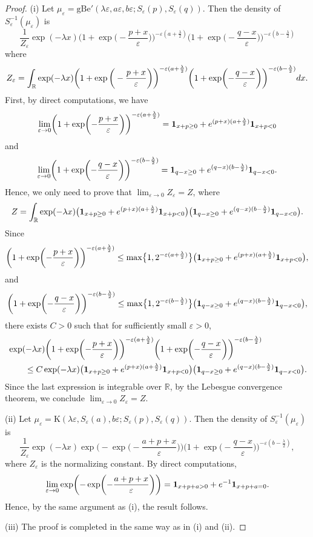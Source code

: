 \documentclass[10pt,a4paper]{amsart}
\def\R{\mathbb{R}}
\def\e{\varepsilon}
\newcommand{\la}{\lambda}
\begin{document}
\begin{proof}
(i) Let $\mu_{\e}=\mathrm{gBe}'(\la \e, a\e ,b \e; S_{\e}(p), S_{\e}(q))$. Then the density of $S_{\e}^{-1}(\mu_{\e})$ is
\[
\frac{1}{Z_{\e}}\exp(-\la x) \biggl(1 +\exp\biggl(-\frac{p+x}{\e}\biggr)\biggr)^{-\e(a+\frac{\la}{2})}\biggl(1 +\exp\biggl(-\frac{q-x}{\e}\biggr)\biggr)^{-\e(b-\frac{\la}{2})}
 \]
 where
 \[
 Z_{\e}=\int_{\R}\exp(-\la x) \biggl(1 +\exp\bigg(-\frac{p+x}{\e}\biggr)\biggr)^{-\e(a+\frac{\la}{2})}\biggl(1 +\exp\biggl(-\frac{q-x}{\e}\biggr)\biggr)^{-\e(b-\frac{\la}{2})} {\rm d}x.
 \]
 First, by direct computations, we have
 \[
 \lim_{\e \to 0}\biggl(1 +\exp\biggl(-\frac{p+x}{\e}\biggr)\biggr)^{-\e(a+\frac{\la}{2})}= \mathbf{1}_{x+p \ge 0} + {\rm e}^{ (p+x)(a+\frac{\la}{2})}\mathbf{1}_{x+p < 0}
 \]
 and
 \[
 \lim_{\e \to 0}\biggl(1 +\exp\biggl(-\frac{q-x}{\e}\biggr)\biggr)^{-\e(b-\frac{\la}{2})}= \mathbf{1}_{q-x \ge 0} + {\rm e}^{ (q-x)(b-\frac{\la}{2})}\mathbf{1}_{q-x < 0}.
 \]
 Hence, we only need to prove that $ \lim_{\e \to 0}Z_{\e}=Z$, where
 \[
 Z=\int_{\R} \exp(-\la x)\bigl( \mathbf{1}_{x+p \ge 0} + {\rm e}^{ (p+x)(a+\frac{\la}{2})}\mathbf{1}_{x+p < 0}
 \bigr)\bigl( \mathbf{1}_{q-x \ge 0} + {\rm e}^{ (q-x)(b-\frac{\la}{2})}\mathbf{1}_{q-x < 0}\bigr).
 \]
 Since
 \[
\biggl(1 +\exp\biggl(-\frac{p+x}{\e}\biggr)\biggr)^{-\e(a+\frac{\la}{2})} \le \max \bigl\{1, 2^{-\e(a+\frac{\la}{2})} \bigr\} \bigl( \mathbf{1}_{x+p \ge 0} + {\rm e}^{ (p+x)(a+\frac{\la}{2})}\mathbf{1}_{x+p < 0}
 \bigr),
 \]
 and
 \[
\biggl(1 +\exp\biggl(-\frac{q-x}{\e}\biggr)\biggr)^{-\e(b-\frac{\la}{2})} \le \max \bigl\{1, 2^{-\e(b-\frac{\la}{2})} \bigr\} \bigl( \mathbf{1}_{q-x \ge 0} + {\rm e}^{ (q-x)(b-\frac{\la}{2})}\mathbf{1}_{q-x < 0}
 \bigr),
 \]
 there exists $C>0$ such that for sufficiently small $\e>0$,
 \begin{align*}
 &\exp(-\la x) \biggl(1 +\exp\biggl(-\frac{p+x}{\e}\biggr)\biggr)^{-\e(a+\frac{\la}{2})}\biggl(1 +\exp\biggl(-\frac{q-x}{\e}\biggr)\biggr)^{-\e(b-\frac{\la}{2})} \\
 &\qquad{} \le C \exp(-\la x)\bigl( \mathbf{1}_{x+p \ge 0} + {\rm e}^{ (p+x)(a+\frac{\la}{2})}\mathbf{1}_{x+p < 0}
 \bigr)\bigl( \mathbf{1}_{q-x \ge 0} + {\rm e}^{ (q-x)(b-\frac{\la}{2})}\mathbf{1}_{q-x < 0}
 \bigr).
 \end{align*}
 Since the last expression is integrable over $\R$, by the Lebesgue convergence theorem, we conclude $\lim_{\e \to 0}Z_{\e}=Z$.

 (ii)
 Let $\mu_{\e}=\mathrm{K}(\la \e, S_{\e}(a) ,b \e; S_{\e}(p), S_{\e}(q))$. Then the density of $S_{\e}^{-1}(\mu_{\e})$ is
\[
\frac{1}{Z_{\e}}\exp(-\la x) \exp\biggl(-\exp\biggl(-\frac{a+p+x}{\e}\biggr)\biggr)\biggl(1 +\exp\biggl(-\frac{q-x}{\e}\biggr)\biggr)^{-\e(b-\frac{\la}{2})},
 \]
 where $Z_{\e}$ is the normalizing constant. By direct computations,
 \[
 \lim_{\e \to 0}\exp\biggl(-\exp\biggl(-\frac{a+p+x}{\e}\biggr)\biggr)= \mathbf{1}_{x+p+a > 0} + {\rm e}^{-1}\mathbf{1}_{x+p+a = 0}.
 \]
 Hence, by the same argument as (i), the result follows.

 (iii) The proof is completed in the same way as in (i) and (ii).
 \end{proof}
\end{document}
